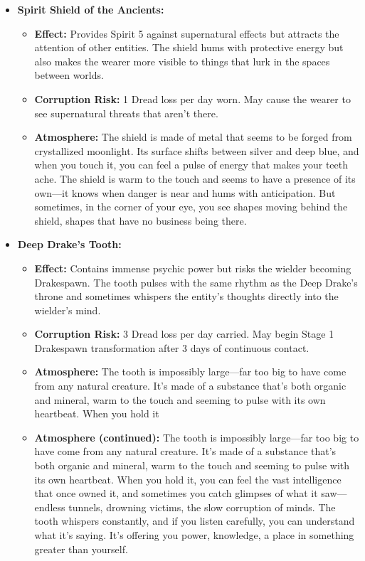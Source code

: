 \documentclass[11pt]{article}
\begin{document}
\begin{itemize}
\item \textbf{Spirit Shield of the Ancients:} 
  \begin{itemize}
  \item \textbf{Effect:} Provides Spirit 5 against supernatural effects but attracts the attention of other entities. The shield hums with protective energy but also makes the wearer more visible to things that lurk in the spaces between worlds.
  \item \textbf{Corruption Risk:} 1 Dread loss per day worn. May cause the wearer to see supernatural threats that aren't there.
  \item \textbf{Atmosphere:} The shield is made of metal that seems to be forged from crystallized moonlight. Its surface shifts between silver and deep blue, and when you touch it, you can feel a pulse of energy that makes your teeth ache. The shield is warm to the touch and seems to have a presence of its own—it knows when danger is near and hums with anticipation. But sometimes, in the corner of your eye, you see shapes moving behind the shield, shapes that have no business being there.
  \end{itemize}
\item \textbf{Deep Drake's Tooth:} 
  \begin{itemize}
  \item \textbf{Effect:} Contains immense psychic power but risks the wielder becoming Drakespawn. The tooth pulses with the same rhythm as the Deep Drake's throne and sometimes whispers the entity's thoughts directly into the wielder's mind.
  \item \textbf{Corruption Risk:} 3 Dread loss per day carried. May begin Stage 1 Drakespawn transformation after 3 days of continuous contact.
  \item \textbf{Atmosphere:} The tooth is impossibly large—far too big to have come from any natural creature. It's made of a substance that's both organic and mineral, warm to the touch and seeming to pulse with its own heartbeat. When you hold it\item \textbf{Atmosphere (continued):} The tooth is impossibly large—far too big to have come from any natural creature. It's made of a substance that's both organic and mineral, warm to the touch and seeming to pulse with its own heartbeat. When you hold it, you can feel the vast intelligence that once owned it, and sometimes you catch glimpses of what it saw—endless tunnels, drowning victims, the slow corruption of minds. The tooth whispers constantly, and if you listen carefully, you can understand what it's saying. It's offering you power, knowledge, a place in something greater than yourself.
  \end{itemize}
\end{itemize}
\end{document}
